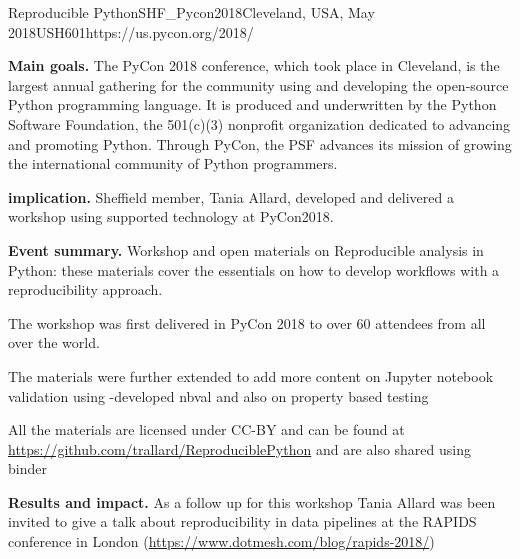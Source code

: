 \begin{event}{Reproducible Python}{SHF_Pycon2018}{Cleveland, USA, May 2018}{USH}{60}{1}{https://us.pycon.org/2018/}

\textbf{Main goals.} The PyCon 2018 conference, which took place in Cleveland, is the largest annual gathering for the community using and developing the open-source Python programming language. It is produced and underwritten by the Python Software Foundation, the 501(c)(3) nonprofit organization dedicated to advancing and promoting Python. Through PyCon, the PSF advances its mission of growing the international community of Python programmers.

\textbf{\ODK implication.} \ODK Sheffield member, Tania Allard, developed and delivered a workshop using \ODK supported technology at PyCon2018.

\textbf{Event summary.} Workshop and open materials on Reproducible analysis in Python: these materials cover the essentials on how to develop workflows with a reproducibility approach.

The workshop was first delivered in PyCon 2018 to over 60 attendees from all over the world.

The materials were further extended to add more content on Jupyter notebook validation using \ODK-developed nbval and also on property based testing

All the materials are licensed under CC-BY and can be found at \url{https://github.com/trallard/ReproduciblePython} and are also shared using binder

\textbf{Results and impact.} As a follow up for this workshop Tania Allard was been invited to give a talk about reproducibility in data pipelines at the RAPIDS conference in London (\url{https://www.dotmesh.com/blog/rapids-2018/})

\end{event}
